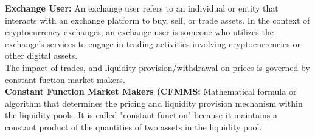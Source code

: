 \textbf{Exchange User:} An exchange user refers to an individual or entity that interacts with an exchange platform to buy, sell, or trade assets. In the context of cryptocurrency exchanges, an exchange user is someone who utilizes the exchange's services to engage in trading activities involving cryptocurrencies or other digital assets.\\

\noindent The impact of trades, and liquidity provision/withdrawal on prices is governed by constant fuction market makers.\\

\noindent \textbf{Constant Function Market Makers (CFMMS:} Mathematical formula or algorithm that determines the pricing and liquidity provision mechanism within the liquidity pools. It is called "constant function" because it maintains a constant product of the quantities of two assets in the liquidity pool.\\

